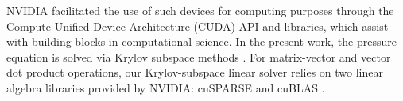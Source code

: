 NVIDIA facilitated the use of such devices for computing purposes through the Compute Unified Device Architecture (CUDA) API and libraries, which assist with building blocks in computational science. In the present work, the pressure equation is solved via Krylov subspace methods \cite{saad2003iterative,vdVorst2003}. For matrix-vector and vector dot product operations, our Krylov-subspace linear solver relies on two linear algebra libraries provided by NVIDIA: cuSPARSE \cite{cuSparse2014} and cuBLAS \cite{cuBlas}. 


